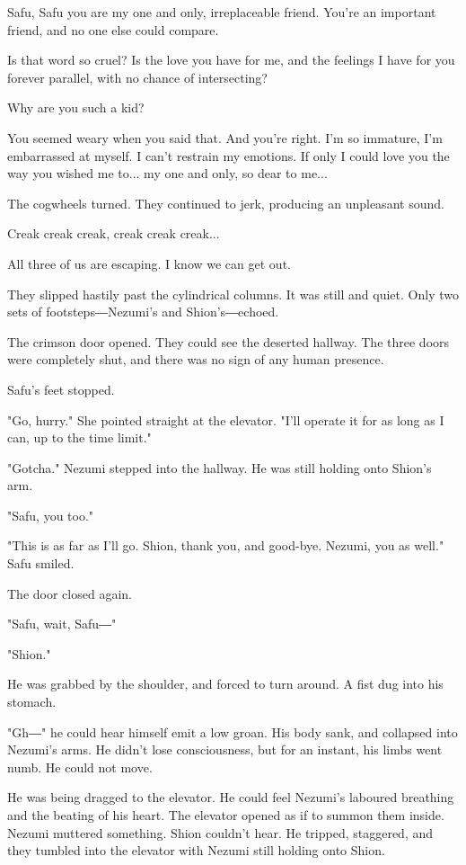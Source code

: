 Safu, Safu you are my one and only, irreplaceable friend. You're an
important friend, and no one else could compare.

Is that word so cruel? Is the love you have for me, and the feelings I
have for you forever parallel, with no chance of intersecting?

Why are you such a kid?

You seemed weary when you said that. And you're right. I'm so immature,
I'm embarrassed at myself. I can't restrain my emotions. If only I could
love you the way you wished me to... my one and only, so dear to me...

The cogwheels turned. They continued to jerk, producing an unpleasant
sound.

Creak creak creak, creak creak creak...

All three of us are escaping. I know we can get out.

They slipped hastily past the cylindrical columns. It was still and
quiet. Only two sets of footsteps―Nezumi's and Shion's―echoed.

The crimson door opened. They could see the deserted hallway. The three
doors were completely shut, and there was no sign of any human presence.

Safu's feet stopped.

"Go, hurry." She pointed straight at the elevator. "I'll operate it for
as long as I can, up to the time limit."

"Gotcha." Nezumi stepped into the hallway. He was still holding onto
Shion's arm.

"Safu, you too."

"This is as far as I'll go. Shion, thank you, and good-bye. Nezumi, you
as well." Safu smiled.

The door closed again.

"Safu, wait, Safu―"

"Shion."

He was grabbed by the shoulder, and forced to turn around. A fist dug
into his stomach.

"Gh―" he could hear himself emit a low groan. His body sank, and
collapsed into Nezumi's arms. He didn't lose consciousness, but for an
instant, his limbs went numb. He could not move.

He was being dragged to the elevator. He could feel Nezumi's laboured
breathing and the beating of his heart. The elevator opened as if to
summon them inside. Nezumi muttered something. Shion couldn't hear. He
tripped, staggered, and they tumbled into the elevator with Nezumi still
holding onto Shion.

